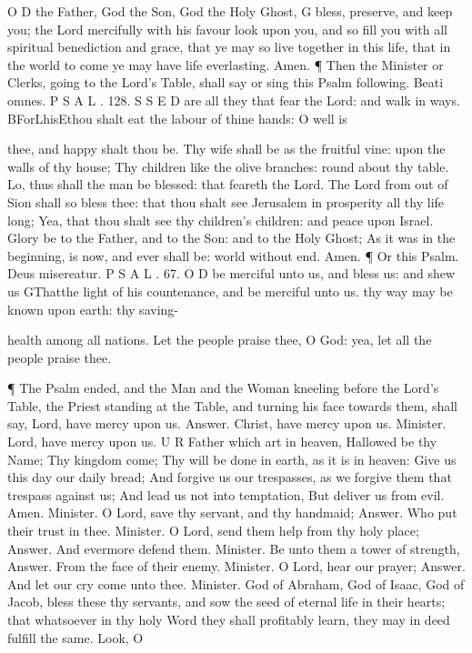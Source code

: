 O D the Father, God the Son, God the Holy Ghost, G bless, preserve, and keep you; the Lord mercifully with his favour look upon you, and so fill you with all spiritual benediction and grace, that ye may so live together in this life, that in the world to come ye may have life everlasting. Amen. ¶ Then the Minister or Clerks, going to the Lord’s Table, shall say or sing this Psalm following. Beati omnes. P S A L . 128. S S E D are all they that fear the Lord: and walk in ways. BForLhisEthou shalt eat the labour of thine hands: O well is

thee, and happy shalt thou be. Thy wife shall be as the fruitful vine: upon the walls of thy house; Thy children like the olive branches: round about thy table. Lo, thus shall the man be blessed: that feareth the Lord. The Lord from out of Sion shall so bless thee: that thou shalt see Jerusalem in prosperity all thy life long; Yea, that thou shalt see thy children's children: and peace upon Israel. Glory be to the Father, and to the Son: and to the Holy Ghost; As it was in the beginning, is now, and ever shall be: world without end. Amen. ¶ Or this Psalm. Deus misereatur. P S A L . 67. O D be merciful unto us, and bless us: and shew us GThatthe light of his countenance, and be merciful unto us. thy way may be known upon earth: thy saving-

health among all nations. Let the people praise thee, O God: yea, let all the people praise thee.

¶ The Psalm ended, and the Man and the Woman kneeling before the Lord’s Table, the Priest standing at the Table, and turning his face towards them, shall say, Lord, have mercy upon us. Answer. Christ, have mercy upon us. Minister. Lord, have mercy upon us. U R Father which art in heaven, Hallowed be thy Name; Thy kingdom come; Thy will be done in earth, as it is in heaven: Give us this day our daily bread; And forgive us our trespasses, as we forgive them that trespass against us; And lead us not into temptation, But deliver us from evil. Amen. Minister. O Lord, save thy servant, and thy handmaid; Answer. Who put their trust in thee. Minister. O Lord, send them help from thy holy place; Answer. And evermore defend them. Minister. Be unto them a tower of strength, Answer. From the face of their enemy. Minister. O Lord, hear our prayer; Answer. And let our cry come unto thee. Minister. God of Abraham, God of Isaac, God of Jacob, bless these thy servants, and sow the seed of eternal life in their hearts; that whatsoever in thy holy Word they shall profitably learn, they may in deed fulfill the same. Look, O

